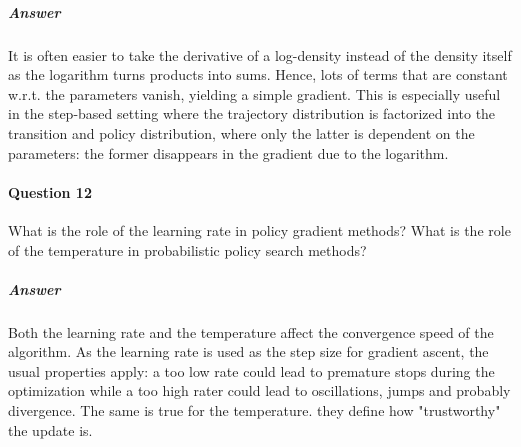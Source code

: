 		\subparagraph{Answer}
			It is often easier to take the derivative of a log-density instead of the density itself as the logarithm turns products into sums. Hence, lots of terms that are constant w.r.t. the parameters vanish, yielding a simple gradient. This is especially useful in the step-based setting where the trajectory distribution is factorized into the transition and policy distribution, where only the latter is dependent on the parameters: the former disappears in the gradient due to the logarithm.

	\paragraph{Question 12}
		What is the role of the learning rate in policy gradient methods? What is the role of the temperature in probabilistic policy search methods?

		\subparagraph{Answer}
			Both the learning rate and the temperature affect the convergence speed of the algorithm. As the learning rate is used as the step size for gradient ascent, the usual properties apply: a too low rate could lead to premature stops during the optimization while a too high rater could lead to oscillations, jumps and probably divergence. The same is true for the temperature. they define how "trustworthy" the update is.

